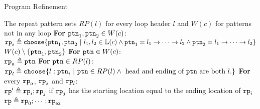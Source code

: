 \begin{algorithm}
\caption{
{Program Refinement}
\label{alg:prog_refine}
}
\begin{algorithmic}[1]
\REQUIRE The repeat pattern sets $RP(l)$ for every loop header $l$ and $W(c)$ for patterns not in any loop
\STATE  \textbf{For} $\mathtt{ptn}_1, \mathtt{ptn}_2 \in W(c)$:
\\ \quad 
$\rprog_{s} \triangleq 
  \rpchoose{
  \rpattern_1, \rpattern_2 ~|~ l_1, l_2 \in \lvar(c) \land 
  \rpattern_1 = l_1 \to \cdots \to l_2 \land \rpattern_2 = l_1 \to \cdots \to l_2
  }
$
\\ \quad 
$ W(c) \setminus \{\mathtt{ptn}_1, \mathtt{ptn}_2\} $
\STATE  \textbf{For} $\mathtt{ptn}\in W(c)$:
\\ \quad 
$\mathtt{rp}_{a} \triangleq  \mathtt{ptn}$
\STATE \textbf{For} $\mathtt{ptn} \in RP(l)$:
\\ \quad
$\rprog_l \triangleq 
\rpchoose{
 l: \rpattern_{i} ~|~ \rpattern \in RP(l) \land \text{ head and ending of } \rpattern \text{ are both } l.
}$
\STATE \textbf{For} every $\mathtt{rp}_a$, $\mathtt{rp}_{s}$ and $\mathtt{rp}_l$:
\\ \quad
$\mathtt{rp}' \triangleq \mathtt{rp}_i; \mathtt{rp}_{j}$
 if $\mathtt{rp}_{j}$ has the starting location equal to the ending location of $\mathtt{rp}_i$
\RETURN $\mathtt{rp} \triangleq \mathtt{rp}_0; \cdots; \mathtt{rp}_{\mathtt{ex}}$
\end{algorithmic}
\end{algorithm}
%

%
